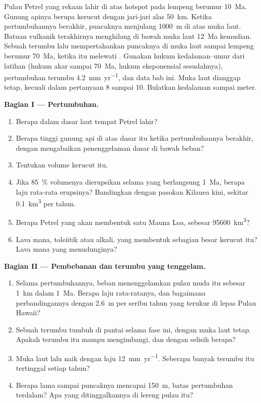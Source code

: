 \begin{problem}\label{pb:b2:oceanic-islands:1}
Pulau Petrel yang rekaan lahir di atas hotspot pada lempeng berumur \qty{10}{Ma}. Gunung apinya
berupa kerucut dengan jari-jari alas \qty{50}{km}. Ketika pertumbuhannya berakhir, puncaknya menjulang \qty{1000}{m} di atas
muka laut. Batuan vulkanik terakhirnya menghilang di bawah muka laut \qty{12}{Ma} kemudian. Sebuah terumbu lalu
mempertahankan puncaknya di muka laut sampai lempeng berumur \qty{70}{Ma}, ketika  itu melewati
. Gunakan hukum kedalaman--umur dari latihan (hukum akar sampai \qty{70}{Ma}, hukum
eksponensial sesudahnya), pertumbuhan terumbu \qty{4.2}{mm.yr^{-1}}, dan data bab ini.
Muka laut dianggap tetap, kecuali dalam pertanyaan 8 sampai 10. Bulatkan kedalaman sampai meter.

\noindent\textbf{Bagian I --- Pertumbuhan.}
\begin{enumerate}
  \item Berapa dalam dasar laut tempat Petrel lahir?
  \item Berapa tinggi gunung api di atas dasar itu ketika pertumbuhannya berakhir, dengan mengabaikan
        penenggelaman dasar di bawah beban?
  \item Tentukan volume kerucut itu.
  \item Jika \qty{85}{\percent} volumenya dierupsikan selama  yang berlangsung \qty{1}{Ma}, berapa
        laju rata-rata erupsinya? Bandingkan dengan pasokan Kilauea kini, sekitar
        \qty{0.1}{km^3} per tahun.
  \item Berapa Petrel yang akan membentuk satu Mauna Loa, sebesar \qty{95600}{km^3}?
  \item Lava mana, toleiitik atau alkali, yang membentuk sebagian besar kerucut itu? Lava mana yang menudunginya?
\end{enumerate}

\noindent\textbf{Bagian II --- Pembebanan dan terumbu yang tenggelam.}
\begin{enumerate}[resume]
  \item Selama pertumbuhannya, beban menenggelamkan pulau muda itu sebesar \qty{1}{km} dalam \qty{1}{Ma}. Berapa
        laju rata-ratanya, dan bagaimana perbandingannya dengan \qty{2.6}{m} per seribu tahun yang terukur
        di lepas Pulau Hawaii?
  \item Sebuah terumbu tumbuh di pantai selama fase ini, dengan muka laut tetap. Apakah terumbu itu mampu mengimbangi, dan
        dengan selisih berapa?
  \item Muka laut lalu naik dengan laju \qty{12}{mm.yr^{-1}}. Seberapa banyak terumbu itu tertinggal setiap
        tahun?
  \item Berapa lama sampai puncaknya mencapai \qty{150}{m}, batas pertumbuhan terdalam? Apa yang
        ditinggalkannya di lereng pulau itu?
\end{enumerate}


\end{problem}
